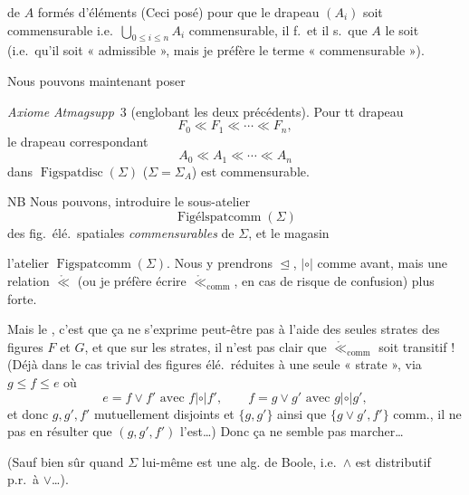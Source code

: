 \documentclass[11pt,a4paper]{article}
\begin{document}
de $A$ formés d'éléments  (Ceci posé) pour que le drapeau $(A_i)$ soit commensurable i.e.\ $\bigcup_{0 \le i \le n} A_i$ commensurable, il f.\ et il s.\ que $A$ le soit (i.e.\ qu'il soit « admissible », mais je préfère  le terme « commensurable »).

Nous pouvons maintenant poser

\textit{Axiome} \textit{Atmagsupp}~3 (englobant les deux précédents). Pour tt drapeau
\[
  F_0 \ll F_1 \ll \cdots \ll F_n ,
\]
le drapeau correspondant
\[
  A_0 \ll A_1 \ll \cdots \ll A_n
\]
dans $\operatorname{Figspatdisc}(\Sigma)$ \quad ($\Sigma = \Sigma_A$) est commensurable.

NB Nous pouvons,  introduire le sous-atelier
\[
  \operatorname{Figélspatcomm}(\Sigma)
\]
des fig.\ élé.\ spatiales \emph{commensurables} de $\Sigma$, et  le magasin 

l'atelier $\operatorname{Figspatcomm}(\Sigma)$. Nous y prendrons $\trianglelefteq$, $|{\circ}|$ comme avant, mais une relation $\mathring{\ll}$ (ou je préfère écrire $\mathring{\ll}_{\mathrm{comm}}$, en cas de risque de confusion) plus forte.

Mais le , c'est que ça ne  s'exprime peut-être pas à l'aide des seules strates des figures $F$ et $G$, et que  sur les strates, il n'est pas clair que $\mathring{\ll}_{\mathrm{comm}}$ soit transitif ! (Déjà dans le cas trivial des figures élé.\ réduites à une seule « strate », via $g \leq f \leq e$ où
\[
  e = f \vee f' \text{ avec } f \mathrel{|{\circ}|} f', \qquad f = g \vee g' \text{ avec } g \mathrel{|{\circ}|} g',
\]
et donc \ill{} $g, g', f'$ mutuellement disjoints et  $\{g, g'\}$ ainsi que $\{g \vee g', f'\}$ comm., il ne  pas en résulter que $(g, g', f')$ l'est…) Donc ça ne semble pas marcher…

(Sauf bien sûr quand $\Sigma$ lui-même est une alg. de Boole, i.e.\ $\wedge$ est distributif p.r.\ à $\vee$…).
\end{document}
